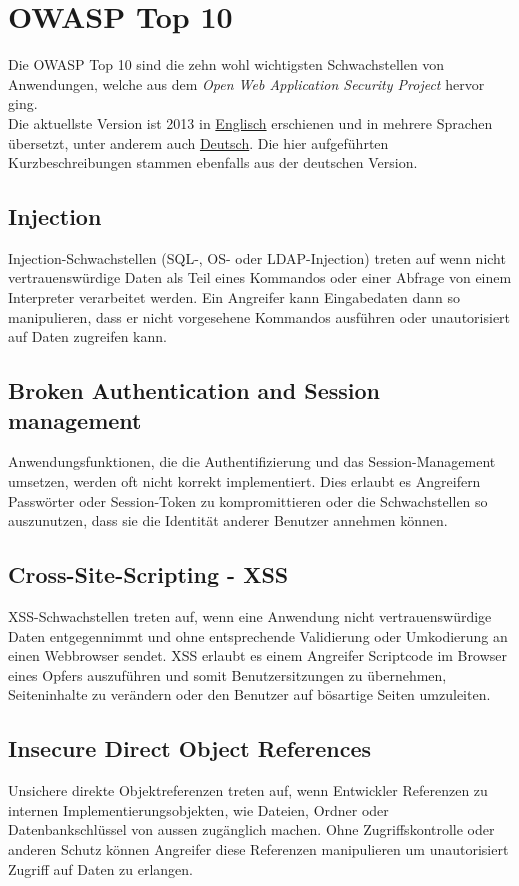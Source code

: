 \section{OWASP Top 10}
Die OWASP Top 10 sind die zehn wohl wichtigsten Schwachstellen von Anwendungen, welche aus dem \textit{Open Web Application Security Project} hervor ging.\\

Die aktuellste Version ist 2013 in \href{http://owasptop10.googlecode.com/files/OWASP\%20Top\%2010\%20-\%202013.pdf}{Englisch} erschienen und in mehrere Sprachen übersetzt, unter anderem auch \href{https://www.owasp.org/images/4/42/OWASP_Top_10_2013_DE_Version_1_0.pdf}{Deutsch}. Die hier aufgeführten Kurzbeschreibungen stammen ebenfalls aus der deutschen Version.

\subsection{Injection}
Injection-Schwachstellen (SQL-, OS- oder LDAP-Injection) treten auf wenn nicht vertrauenswürdige Daten als Teil eines Kommandos oder einer Abfrage von einem Interpreter verarbeitet werden. Ein Angreifer kann Eingabedaten dann so manipulieren, dass er nicht vorgesehene Kommandos ausführen oder unautorisiert auf Daten zugreifen kann.

\subsection{Broken Authentication and Session management}
Anwendungsfunktionen, die die Authentifizierung und das Session-Management umsetzen, werden oft nicht korrekt implementiert. Dies erlaubt es Angreifern Passwörter oder Session-Token zu kompromittieren oder die Schwachstellen so auszunutzen, dass sie die Identität anderer Benutzer annehmen können.

\subsection{Cross-Site-Scripting - XSS}
XSS-Schwachstellen treten auf, wenn eine Anwendung nicht vertrauenswürdige Daten entgegennimmt und ohne entsprechende Validierung oder Umkodierung an einen Webbrowser sendet. XSS erlaubt es einem Angreifer Scriptcode im Browser eines Opfers auszuführen und somit Benutzersitzungen zu übernehmen, Seiteninhalte zu verändern oder den Benutzer auf bösartige Seiten umzuleiten.

\subsection{Insecure Direct Object References}
Unsichere direkte Objektreferenzen treten auf, wenn Entwickler Referenzen zu internen Implementierungsobjekten, wie Dateien, Ordner oder Datenbankschlüssel von aussen zugänglich machen. Ohne Zugriffskontrolle oder anderen Schutz können Angreifer diese Referenzen manipulieren um unautorisiert Zugriff auf Daten zu erlangen.

